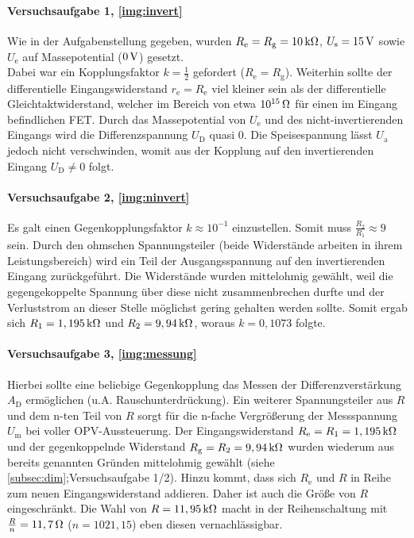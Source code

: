 \documentclass[numbers=noenddot,12pt,a4paper]{scrartcl}
\newcommand{\ix}[1]{_\text{#1}}
\begin{document}
\paragraph{Versuchsaufgabe 1, \ref{img:invert}}
Wie in der Aufgabenstellung gegeben, wurden $R\ix{e}=R\ix{g}=\unit[10]{k\Omega}$, $U\ix{s}=\unit[15]{V}$ sowie $U\ix{e}$ auf Massepotential ($\unit[0]{V}$) gesetzt.\\
Dabei war ein Kopplungsfaktor $k=\frac{1}{2}$ gefordert ($R\ix{e}=R\ix{g}$). Weiterhin sollte der differentielle Eingangswiderstand $r\ix{e}=R\ix{e}$ viel kleiner sein als der differentielle Gleichtaktwiderstand, welcher im Bereich von etwa $\unit[10^{15}]{\Omega}$ für einen im Eingang befindlichen FET. Durch das Massepotential von $U\ix{e}$ und des nicht-invertierenden Eingangs wird die Differenzspannung $U\ix{D}$ quasi 0. Die Speisespannung lässt  $U\ix{a}$ jedoch nicht verschwinden, womit aus der Kopplung auf den invertierenden Eingang $U\ix{D}\neq0$ folgt.
\paragraph{Versuchsaufgabe 2, \ref{img:ninvert}}
Es galt einen Gegenkopplungsfaktor $k\approx10^{-1}$ einzustellen. Somit muss $\frac{R_2}{R_1}\approx9$ sein. Durch den ohmschen Spannungsteiler (beide Widerstände arbeiten in ihrem Leistungsbereich) wird ein Teil der Ausgangsspannung auf den invertierenden Eingang zurückgeführt. Die Widerstände wurden mittelohmig gewählt, weil die gegengekoppelte Spannung über diese nicht zusammenbrechen durfte und der Verluststrom an dieser Stelle möglichst gering gehalten werden sollte. Somit ergab sich $R_1=\unit[1,195]{k\Omega}$ und $R_2=\unit[9,94]{k\Omega}$, woraus $k=0,1073$ folgte.
\paragraph{Versuchsaufgabe 3, \ref{img:messung}}
Hierbei sollte eine beliebige Gegenkopplung das Messen der Differenzverstärkung $A\ix{D}$ ermöglichen (u.A. Rauschunterdrückung). Ein weiterer Spannungsteiler aus $R$ und dem n-ten Teil von $R$ sorgt für die n-fache Vergrößerung der Messspannung $U\ix{m}$ bei voller OPV-Aussteuerung. Der Eingangswiderstand $R\ix{e}=R_1=\unit[1,195]{k\Omega}$ und der gegenkoppelnde Widerstand $R\ix{g}=R_2=\unit[9,94]{k\Omega}$ wurden wiederum aus bereits genannten Gründen mittelohmig gewählt (siehe \ref{subsec:dim};Versuchsaufgabe 1/2). Hinzu kommt, dass sich $R\ix{e}$ und $R$ in Reihe zum neuen Eingangswiderstand addieren. Daher ist auch die Größe von $R$ eingeschränkt. Die Wahl von $R=\unit[11,95]{k\Omega}$ macht in der Reihenschaltung mit $\frac{R}{n}=\unit[11,7]{\Omega}$ ($n=1021,15$) eben diesen vernachlässigbar.
\end{document}
